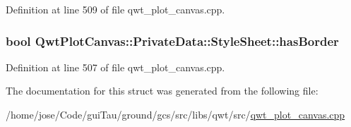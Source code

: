 Definition at line 509 of file qwt\-\_\-plot\-\_\-canvas.\-cpp.

\hypertarget{struct_qwt_plot_canvas_1_1_private_data_1_1_style_sheet_a43317a68815a44f79dc025d3594bd0dc}{
\subsubsection[{has\-Border}]{\setlength{\rightskip}{0pt plus 5cm}bool Qwt\-Plot\-Canvas\-::\-Private\-Data\-::\-Style\-Sheet\-::has\-Border}}\label{struct_qwt_plot_canvas_1_1_private_data_1_1_style_sheet_a43317a68815a44f79dc025d3594bd0dc}


Definition at line 507 of file qwt\-\_\-plot\-\_\-canvas.\-cpp.



The documentation for this struct was generated from the following file\-:\begin{DoxyCompactItemize}
\item 
/home/jose/\-Code/gui\-Tau/ground/gcs/src/libs/qwt/src/\hyperlink{qwt__plot__canvas_8cpp}{qwt\-\_\-plot\-\_\-canvas.\-cpp}\end{DoxyCompactItemize}
